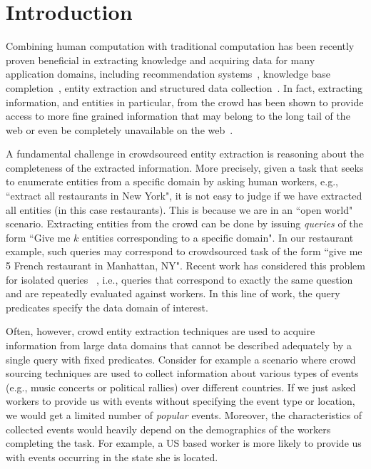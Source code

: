 \documentclass{vldb}
\begin{document}
\section{Introduction}
\label{sec:intro}
Combining human computation with traditional computation has been recently proven beneficial in extracting knowledge and acquiring data for many application domains, including recommendation systems~\cite{amsterdamer:2014}, knowledge base completion~\cite{kondredi:2014}, entity extraction and structured data collection~\cite{trushkowsky:2013, park:2014}. In fact, extracting information, and entities in particular, from the crowd has been shown to provide access to more fine grained information that may belong to the long tail of the web or even be completely unavailable on the web~\cite{franklin:2011, Parameswaran:2012, west:2014}.

A fundamental challenge in crowdsourced entity extraction is reasoning about the completeness of the extracted information. More precisely, given a task that seeks to enumerate entities from a specific domain by asking human workers, e.g., ``extract all restaurants in New York", it is not easy to judge if we have extracted all entities (in this case restaurants). This is because we are in an ``open world"~\cite{trushkowsky:2013} scenario. Extracting entities from the crowd can be done by issuing {\em queries} of the form ``Give me $k$ entities corresponding to a specific domain". In our restaurant example, such queries may correspond to crowdsourced task of the form ``give me 5 French restaurant in Manhattan, NY". Recent work has considered this problem for isolated queries~\cite{trushkowsky:2013} , i.e., queries that correspond to exactly the same question and are repeatedly evaluated against workers. In this line of work, the query predicates specify the data domain of interest. 

Often, however, crowd entity extraction techniques are used to acquire information from large data domains that cannot be described adequately by a single query with fixed predicates. Consider for example a scenario where crowd sourcing techniques are used to collect information about various types of events (e.g., music concerts or political rallies) over different countries. If we just asked workers to provide us with events without specifying the event type or location, we would get a limited number of {\em popular} events. Moreover, the characteristics of collected events would heavily depend on the demographics of the workers completing the task. For example, a US based worker is more likely to provide us with events occurring in the state she is located. 
\end{document}
